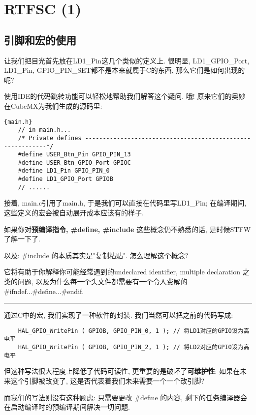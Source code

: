 
\section{RTFSC (1)}

\subsection{引脚和宏的使用}
让我们把目光首先放在LD1\_Pin这几个类似的定义上. 很明显, LD1\_GPIO\_Port, LD1\_Pin, GPIO\_PIN\_SET都不是本来就属于C的东西, 那么它们是如何出现的呢?

使用IDE的代码跳转功能可以轻松地帮助我们解答这个疑问. 哦! 原来它们的奥妙在CubeMX为我们生成的源码里:
\begin{lstlisting}{main.h}
	// in main.h...
	/* Private defines -----------------------------------------------------------*/
	#define USER_Btn_Pin GPIO_PIN_13
	#define USER_Btn_GPIO_Port GPIOC
	#define LD1_Pin GPIO_PIN_0
	#define LD1_GPIO_Port GPIOB
	// ......
\end{lstlisting}

接着, main.c引用了main.h, 于是我们可以直接在代码里写LD1\_Pin; 在编译期间, 这些定义的宏会被自动展开成本应该有的样子.

\begin{problem}
如果你对\textbf{预编译指令, \#define, \#include} 这些概念仍不熟悉的话, 是时候STFW了解一下了.

以及: \#include 的本质其实是"复制粘贴". 怎么理解这个概念?

它将有助于你解释你可能经常遇到的undeclared identifier, multiple declaration 之类的问题, 以及为什么每一个头文件都需要有一个令人费解的\#ifndef...\#define...\#endif.
\end{problem}
\vspace{15pt}
\hrule
\vspace{10pt}
通过C中的宏, 我们实现了一种软件的封装. 我们当然可以把之前的代码写成:
\begin{lstlisting}
	HAL_GPIO_WritePin ( GPIOB, GPIO_PIN_0, 1 ); // 将LD1对应的GPIO设为高电平
	HAL_GPIO_WritePin ( GPIOB, GPIO_PIN_2, 1 ); // 将LD2对应的GPIO设为高电平
\end{lstlisting}

但这种写法很大程度上降低了代码可读性, 更重要的是破坏了\textbf{可维护性}: 如果在未来这个引脚被改变了, 这是否代表着我们未来需要一个一个改引脚?

而我们的写法则没有这种顾虑: 只需要更改 \#define 的内容, 剩下的任务编译器会在启动编译时的预编译期间解决一切问题.

